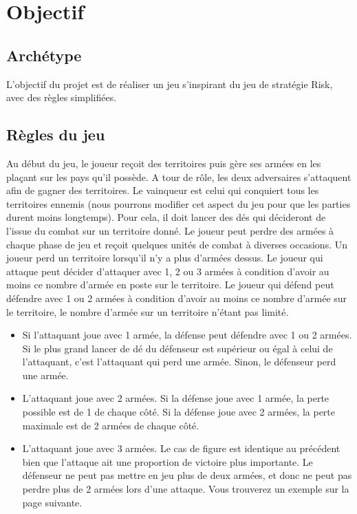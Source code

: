 \section{Objectif}

\subsection{Archétype}
    L'objectif du projet est de réaliser un jeu s'inspirant du jeu de stratégie Risk, avec des règles simplifiées.
    
\subsection{Règles du jeu}
    Au début du jeu, le joueur reçoit des territoires puis gère ses armées en les plaçant sur les pays qu'il possède. A tour de rôle, les deux adversaires s'attaquent afin de gagner des territoires. Le vainqueur est celui qui conquiert tous les territoires ennemis (nous pourrons modifier cet aspect du jeu pour que les parties durent moins longtemps). Pour cela, il doit lancer des dés qui décideront de l'issue du combat sur un territoire donné. Le joueur peut perdre des armées à chaque phase de jeu et reçoit quelques unités de combat à diverses occasions. Un joueur perd un territoire lorsqu'il n'y a plus d'armées dessus. 
    \newline
    \newline
    Le joueur qui attaque peut décider d'attaquer avec 1, 2 ou 3 armées à condition d'avoir au moins ce nombre d'armée en poste sur le territoire. Le joueur qui défend peut défendre avec 1 ou 2 armées à condition d'avoir au moins ce nombre d'armée sur le territoire, le nombre d'armée sur un territoire n'étant pas limité.
    \begin{itemize}
        \item Si l'attaquant joue avec 1 armée, la défense peut défendre avec 1 ou 2 armées. Si le plus grand lancer de dé du défenseur est supérieur ou égal à celui de l'attaquant, c'est l'attaquant qui perd une armée. Sinon, le défenseur perd une armée. 
        \item L'attaquant joue avec 2 armées. Si la défense joue avec 1 armée, la perte possible est de 1 de chaque côté. Si la défense joue avec 2 armées, la perte maximale est de 2 armées de chaque côté. 
        \item L'attaquant joue avec 3 armées. Le cas de figure est identique au précédent bien que l'attaque ait une proportion de victoire plus importante. Le défenseur ne peut pas mettre en jeu plus de deux armées, et donc ne peut pas perdre plus de 2 armées lors d'une attaque. Vous trouverez un exemple sur la page suivante. 
        \newline
        \newline
    \end{itemize}
    
